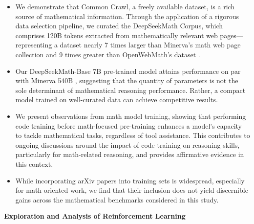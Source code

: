 \begin{itemize}[topsep=0pt]
    \item We demonstrate that Common Crawl, a freely available dataset, is a rich source of mathematical information. Through the application of a rigorous data selection pipeline, we curated the DeepSeekMath Corpus, which comprises 120B tokens extracted from mathematically relevant web pages—representing a dataset nearly 7 times larger than Minerva’s math web page collection \citep{minerva} and 9 times greater than OpenWebMath’s dataset \citep{openwebmath}.

    \item Our DeepSeekMath-Base 7B pre-trained model attains performance on par with Minerva 540B \citep{minerva}, suggesting that the quantity of parameters is not the sole determinant of mathematical reasoning performance. Rather, a compact model trained on well-curated data can achieve competitive results.

    \item We present observations from math model training, showing that performing code training before math-focused pre-training enhances a model’s capacity to tackle mathematical tasks, regardless of tool assistance. This contributes to ongoing discussions around the impact of code training on reasoning skills, particularly for math-related reasoning, and provides affirmative evidence in this context.

    \item While incorporating arXiv papers into training sets is widespread, especially for math-oriented work, we find that their inclusion does not yield discernible gains across the mathematical benchmarks considered in this study.
\end{itemize}

\textbf{Exploration and Analysis of Reinforcement Learning}

